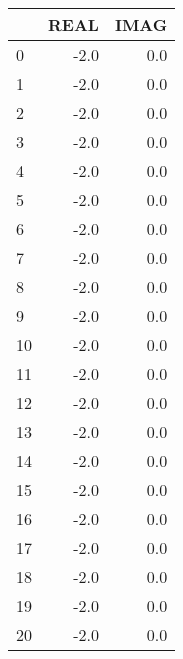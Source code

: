 \begin{tabular}{lrr}
\toprule
{} &  REAL &  IMAG \\
\midrule
0  &  -2.0 &   0.0 \\
1  &  -2.0 &   0.0 \\
2  &  -2.0 &   0.0 \\
3  &  -2.0 &   0.0 \\
4  &  -2.0 &   0.0 \\
5  &  -2.0 &   0.0 \\
6  &  -2.0 &   0.0 \\
7  &  -2.0 &   0.0 \\
8  &  -2.0 &   0.0 \\
9  &  -2.0 &   0.0 \\
10 &  -2.0 &   0.0 \\
11 &  -2.0 &   0.0 \\
12 &  -2.0 &   0.0 \\
13 &  -2.0 &   0.0 \\
14 &  -2.0 &   0.0 \\
15 &  -2.0 &   0.0 \\
16 &  -2.0 &   0.0 \\
17 &  -2.0 &   0.0 \\
18 &  -2.0 &   0.0 \\
19 &  -2.0 &   0.0 \\
20 &  -2.0 &   0.0 \\
\bottomrule
\end{tabular}

